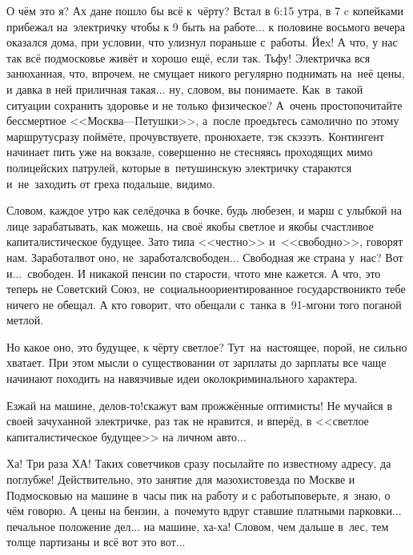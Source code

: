О чём это я? Ах да\mdash не пошло бы всё к~чёрту? Встал в 6:15 утра, в 7 c копейками прибежал на~электричку чтобы к 9 быть на работе$\ldots$ к половине восьмого вечера оказался дома, при условии, что улизнул пораньше с~работы. Йеx! А что, у нас так всё подмосковье живёт и хорошо ещё, если так. Тьфу! Электричка вся занюханная, что, впрочем, не смущает никого регулярно поднимать на~неё цены, и давка в ней приличная такая$\ldots$ ну, словом, вы понимаете. Как~в~такой ситуации сохранить здоровье и не только физическое? А~очень просто\mdash почитайте бессмертное <<Москва\thinspace\nobreakdash---\thinspace Петушки>>\cite{МоскваПетушки}, а~после проедьтесь самолично по этому маршруту\mdash сразу поймёте, прочувствуете, пронюхаете, тэк скэзэть. Контингент начинает пить уже на вокзале, совершенно не стесняясь проходящих мимо полицейских патрулей, которые в~петушинскую электричку стараются и~не~заходить от греха подальше, видимо.

Словом, каждое утро как селёдочка в бочке, будь любезен, и марш с улыбкой на лице зарабатывать, как можешь, на своё якобы светлое и якобы счастливое капиталистическое будущее. Зато типа <<честно>> и~<<свободно>>, говорят нам. Заработал\mdash вот оно, не~заработал\mdash свободен$\ldots$ Свободная же страна у~нас? Вот и$\ldots$~свободен. И никакой пенсии по старости, что\sdash то мне кажется. А что, это теперь не Советский Союз, не~социально\sdash ориентированное государство\mdash никто тебе ничего не обещал. А кто говорит, что обещали с~танка в~91-м\mdash гони того поганой метлой.

Но какое оно, это будущее, к чёрту светлое? Тут~на~настоящее, порой, не сильно хватает. 
При этом мысли о существовании от зарплаты до зарплаты все чаще начинают походить на навязчивые идеи околокриминального характера.

\diagdash Езжай на машине, делов-то!\mdash скажут вам прожжённые оптимисты! \mdash Не мучайся в своей зачуханной электричке, раз так не нравится, и вперёд, в <<светлое капиталистическое будущее>> на личном авто$\ldots$ 

Ха! Три раза ХА! Таких советчиков сразу посылайте по известному адресу, да поглубже! Действительно, это занятие для мазохистов\mdash езда по Москве и Подмосковью на машине в~часы пик на работу и с работы\mdash поверьте, я~знаю, о чём говорю. А цены на бензин, а~почему\sdash то вдруг ставшие платными парковки$\ldots$ печальное положение дел$\ldots$ на машине, ха-ха! Словом, чем дальше в~лес, тем толще партизаны и всё вот это вот$\ldots$%

